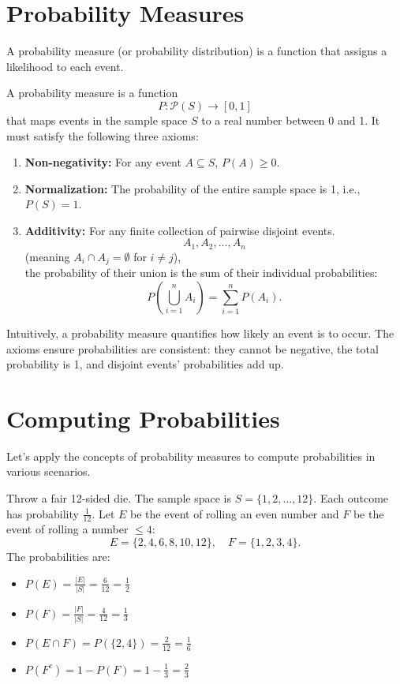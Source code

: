 \section{Probability Measures}

A probability measure (or probability distribution) is a function that assigns a likelihood to each event.

\begin{definition}
A probability measure is a function 
\[
P: \mathcal{P}(S) \to [0,1]
\] 
that maps events in the sample space $S$ to a real number between 0 and 1. It must satisfy the following three axioms:
\begin{enumerate}
    \item \textbf{Non-negativity:} For any event $A \subseteq S$, $P(A) \geq 0$.
    \item \textbf{Normalization:} The probability of the entire sample space is 1, i.e., $P(S) = 1$.
    \item \textbf{Additivity:} For any finite collection of pairwise disjoint events. \\ 
    $$A_1, A_2, \dots, A_n$$ (meaning $A_i \cap A_j = \emptyset$ for $i \neq j$), \\ 
    the probability of their union is the sum of their individual probabilities:
    \[
        P\left(\bigcup_{i=1}^{n} A_i\right) = \sum_{i=1}^{n} P(A_i).
    \]
\end{enumerate}
\end{definition}

\begin{remark}
Intuitively, a probability measure quantifies how likely an event is to occur. The axioms ensure probabilities are consistent: they cannot be negative, the total probability is 1, and disjoint events’ probabilities add up.
\end{remark}
\section{Computing Probabilities}

Let's apply the concepts of probability measures to compute probabilities in various scenarios.

\begin{eg}
Throw a fair 12-sided die. The sample space is $S = \{1, 2, \dots, 12\}$. Each outcome has probability $\frac{1}{12}$. Let $E$ be the event of rolling an even number and $F$ be the event of rolling a number $\le 4$:
\[
    E = \{2, 4, 6, 8, 10, 12\}, \quad F = \{1, 2, 3, 4\}.
\]
The probabilities are:
\begin{itemize}
    \item $P(E) = \frac{|E|}{|S|} = \frac{6}{12} = \frac{1}{2}$
    \item $P(F) = \frac{|F|}{|S|} = \frac{4}{12} = \frac{1}{3}$
    \item $P(E \cap F) = P(\{2,4\}) = \frac{2}{12} = \frac{1}{6}$
    \item $P(F^c) = 1 - P(F) = 1 - \frac{1}{3} = \frac{2}{3}$
\end{itemize}
\end{eg}

